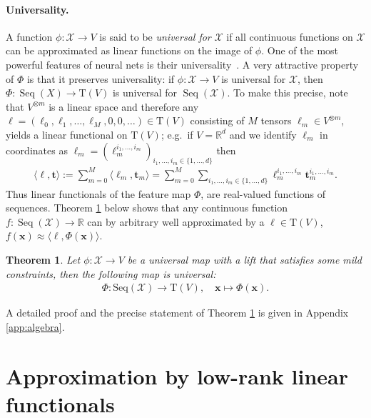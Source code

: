 \documentclass{article} \usepackage{iclr2021_conference,times}
\newcommand{\R}{\mathbb{R}}
\newcommand{\bx}{\mathbf{x}}
\newcommand{\cX}{\mathcal{X}}
\newcommand{\T}[1]{\mathrm{T}({#1})}
\newcommand{\bt}{\mathbf{t}}
\newcommand{\Seq}[1]{\operatorname{Seq}(#1)}
\theoremstyle{plain}
\newtheorem{thm}{Theorem}[section]
\theoremstyle{definition}
\begin{document}
\paragraph{Universality.}
A function $ \phi : \cX \to V $ is said to be \emph{universal for }$\cX$ if all continuous functions on $ \cX $ can be approximated as linear functions on the image of $ \phi $.
One of the most powerful features of neural nets is their universality~\citep{hornik1991approximation}.
A very attractive property of $\Phi$ is that it preserves universality: if $\phi:\cX \to V$ is universal for $\cX$, then $\Phi: \Seq{X} \to \T{V}$ is universal for $\Seq{\cX}$. 
To make this precise, note that $V^{\otimes m}$ is a linear space and therefore any $\ell= (\ell_0,\ell_1,\ldots,\ell_M,0,0,\ldots) \in \T{V}$ consisting of $M$ tensors $\ell_m\in V^{\otimes m}$, yields a linear functional on $\T{V}$; e.g.~if $V=\R^d$ and we identify $\ell_m$ in coordinates as $\ell_m=(\ell_m^{i_1,\ldots,i_m})_{i_1,\ldots,i_m \in \{1,\ldots,d\}}$ then
\begin{align}\label{eq: coordinates functional}
  \langle \ell, \bt \rangle:= \sum_{m=0}^M \langle \ell_m, \bt_m \rangle = \sum_{m = 0}^M \sum_{i_1,\ldots,i_m \in \{1,\ldots,d\}} \ell^{i_1,\ldots,i_m}_m \bt_m^{i_1,\ldots,i_m}.
\end{align}
Thus linear functionals of the feature map $\Phi$, are real-valued functions of sequences.
Theorem \ref{thm:univ} below shows that any continuous function $f:\Seq{\cX}\to \R$ can by arbitrary well approximated by a $\ell \in \T{V}$, $f(\bx) \approx \langle \ell, \Phi(\bx) \rangle$.
\begin{thm} \label{thm:univ}
	Let $ \phi : \cX \to V $  be a universal map with a lift that satisfies some mild constraints, then the following map is universal:
	\begin{align}
\Phi:	\mathrm{Seq}(\cX) \to \T{V}, \quad \bx \mapsto \Phi(\bx).
	\end{align}
\end{thm}
A detailed proof and the precise statement of Theorem \ref{thm:univ} is given in Appendix \ref{app:algebra}.

\section{Approximation by low-rank linear functionals} \label{sec:3}
\end{document}
